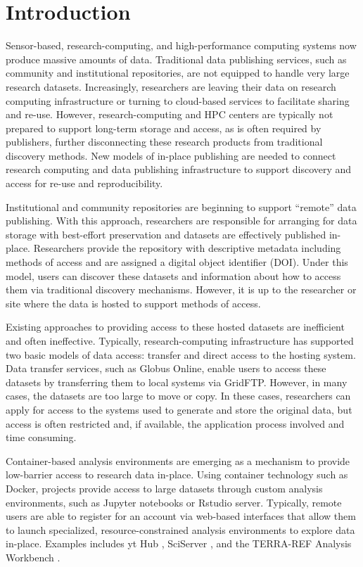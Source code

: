 \documentclass{sig-alternate}
\begin{document}
\section{Introduction}

Sensor-based, research-computing, and high-performance computing systems now produce massive amounts of data.  Traditional data publishing services, such as community and institutional repositories, are not equipped to handle very large research datasets.  Increasingly, researchers are leaving their data on research computing infrastructure or turning to cloud-based services to facilitate sharing and re-use. However, research-computing and HPC centers are typically not prepared to support long-term storage and access, as is often required by publishers, further disconnecting these research products from traditional discovery methods. New models of in-place publishing are needed to connect research computing and data publishing infrastructure to support discovery and access for re-use and reproducibility.

Institutional and community repositories are beginning to support ``remote'' data publishing.  With this approach, researchers are responsible for arranging for data storage with best-effort preservation and datasets are effectively published in-place. Researchers provide the repository with descriptive metadata including methods of access and are assigned a digital object identifier (DOI).  Under this model, users can discover these datasets and information about how to access them via traditional discovery mechanisms. However, it is up to the researcher or site where the data is hosted to support methods of access.

Existing approaches to providing access to these hosted datasets are inefficient and often ineffective.  Typically, research-computing infrastructure has supported two basic models of data access: transfer and direct access to the hosting system.  Data transfer services, such as Globus Online, enable users to access these datasets by transferring them to local systems via GridFTP.  However, in many cases, the datasets are too large to move or copy. In these cases, researchers can apply for access to the systems used to generate and store  the original data, but access is often restricted and, if available, the application process involved and time consuming.

Container-based analysis environments are emerging as a mechanism to provide low-barrier access to research data in-place.  Using container technology such as Docker, projects provide access to large datasets through custom analysis environments, such as Jupyter notebooks or Rstudio server.  Typically, remote users are able to register for an account via web-based interfaces that allow them to launch specialized, resource-constrained analysis environments to explore data in-place. Examples includes yt Hub \cite{zuhone2016galaxy}, SciServer \cite{Medvedev:2016:SCB:2949689.2949700}, and the TERRA-REF Analysis Workbench \cite{willis_craig_2017_580057}.
\end{document}
